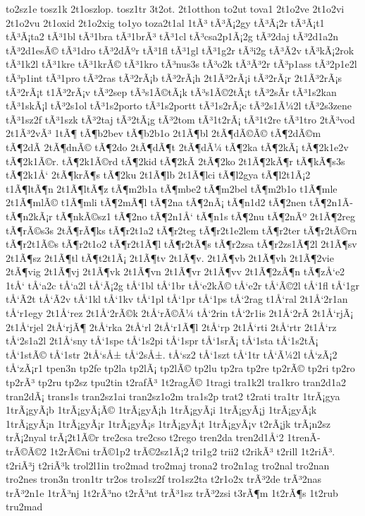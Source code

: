 {to2sz1e
tosz1k
2t1oszlop.
tosz1tr
3t2ot.
2t1otthon
to2ut
tova1
2t1o2ve
2t1o2vi
2t1o2vu
2t1oxid
2t1o2xig
to1yo
toza2t1al
1tÃ³
tÃ³Ã¡2gy
tÃ³Ã¡2r
tÃ³Ã¡t1
tÃ³Ã¡ta2
tÃ³1bl
tÃ³1bra
tÃ³1brÃ³
tÃ³1cl
tÃ³csa2p1Ã¡2g
tÃ³2daj
tÃ³2d1a2n
tÃ³2d1esÃ©
tÃ³1dro
tÃ³2dÃºr
tÃ³1fl
tÃ³1gl
tÃ³1g2r
tÃ³i2g
tÃ³Ã­2v
tÃ³kÃ¡2rok
tÃ³1k2l
tÃ³1kre
tÃ³1krÃ©
tÃ³1kro
tÃ³nus3s
tÃ³o2k
tÃ³Ã³2r
tÃ³p1ass
tÃ³2p1e2l
tÃ³p1int
tÃ³1pro
tÃ³2ras
tÃ³2rÃ¡b
tÃ³2rÃ¡h
2t1Ã³2rÃ¡i
tÃ³2rÃ¡r
2t1Ã³2rÃ¡s
tÃ³2rÃ¡t
t1Ã³2rÃ¡v
tÃ³2sep
tÃ³s1Ã©tÃ¡k
tÃ³s1Ã©2tÃ¡t
tÃ³2sÃ­r
tÃ³1s2kan
tÃ³1skÃ¡l
tÃ³2s1ol
tÃ³1s2porto
tÃ³1s2portt
tÃ³1s2rÃ¡c
tÃ³2s1Ã¼2l
tÃ³2s3zene
tÃ³1sz2f
tÃ³1szk
tÃ³2taj
tÃ³2tÃ¡g
tÃ³2tom
tÃ³1t2rÃ¡
tÃ³1t2re
tÃ³1tro
2tÃ³vod
2t1Ã³2vÃ³
1tÃ¶
tÃ¶b2bev
tÃ¶b2b1o
2t1Ã¶bl
2tÃ¶dÃ©Ã©
tÃ¶2dÃ©m
tÃ¶2dÃ­
2tÃ¶dnÃ©
tÃ¶2do
2tÃ¶dÃ¶t
2tÃ¶dÃ¼
tÃ¶2ka
tÃ¶2kÃ¡
tÃ¶2k1e2v
tÃ¶2k1Ã©r.
tÃ¶2k1Ã©rd
tÃ¶2kid
tÃ¶2kÃ­
2tÃ¶2ko
2t1Ã¶2kÃ¶r
tÃ¶kÃ¶s3s
tÃ¶2k1Å‘
2tÃ¶krÃ¶s
tÃ¶2ku
2t1Ã¶lb
2t1Ã¶lci
tÃ¶l2gya
tÃ¶l2t1Ã¡2
t1Ã¶ltÃ¶n
2t1Ã¶ltÃ¶z
tÃ¶m2b1a
tÃ¶mbe2
tÃ¶m2bel
tÃ¶m2b1o
t1Ã¶mle
2t1Ã¶mlÃ©
t1Ã¶mli
tÃ¶2mÃ¶l
tÃ¶2na
tÃ¶2nÃ¡
tÃ¶n1d2
tÃ¶2nen
tÃ¶2n1Ã­
tÃ¶n2kÃ¡r
tÃ¶nkÃ©sz1
tÃ¶2no
tÃ¶2n1Å‘
tÃ¶n1s
tÃ¶2nu
tÃ¶2nÃº
2t1Ã¶2reg
tÃ¶rÃ©s3s
2tÃ¶rÃ¶ks
tÃ¶r2t1a2
tÃ¶r2teg
tÃ¶r2t1e2lem
tÃ¶r2ter
tÃ¶r2tÃ©rn
tÃ¶r2t1Ã©s
tÃ¶r2t1o2
tÃ¶r2t1Ã¶l
tÃ¶r2tÃ¶s
tÃ¶r2zsa
tÃ¶r2zs1Ã¶2l
2t1Ã¶sv
2t1Ã¶sz
2t1Ã¶tl
tÃ¶t2t1Ã¡
2t1Ã¶tv
2t1Ã¶v.
2t1Ã¶vb
2t1Ã¶vh
2t1Ã¶2vie
2tÃ¶vig
2t1Ã¶vj
2t1Ã¶vk
2t1Ã¶vn
2t1Ã¶vr
2t1Ã¶vv
2t1Ã¶2zÃ¶n
tÃ¶zÅ‘e2
1tÅ‘
tÅ‘a2c
tÅ‘a2l
tÅ‘Ã¡2g
tÅ‘1bl
tÅ‘1br
tÅ‘e2kÃ©
tÅ‘e2r
tÅ‘Ã©2l
tÅ‘1fl
tÅ‘1gr
tÅ‘Ã­2t
tÅ‘Ã­2v
tÅ‘1kl
tÅ‘1kv
tÅ‘1pl
tÅ‘1pr
tÅ‘1ps
tÅ‘2rag
t1Å‘ral
2t1Å‘2r1an
tÅ‘r1egy
2t1Å‘rez
2t1Å‘2rÃ©k
2tÅ‘rÃ©Ã¼
tÅ‘2rin
tÅ‘2r1is
2t1Å‘2rÃ­
2t1Å‘rjÃ¡
2t1Å‘rjel
2tÅ‘rjÃ¶
2tÅ‘rka
2tÅ‘rl
2tÅ‘r1Ã¶l
2tÅ‘rp
2t1Å‘rti
2tÅ‘rtr
2t1Å‘rz
tÅ‘2s1a2l
2t1Å‘sny
tÅ‘1spe
tÅ‘1s2pi
tÅ‘1spr
tÅ‘1srÃ¡
tÅ‘1sta
tÅ‘1s2tÃ¡
tÅ‘1stÃ©
tÅ‘1str
2tÅ‘sÅ±
tÅ‘2sÅ±.
tÅ‘sz2
tÅ‘1szt
tÅ‘1tr
tÅ‘Ã¼2l
tÅ‘zÃ¡2
tÅ‘zÃ¡r1
tpen3n
tp2fe
tp2la
tp2lÃ¡
tp2lÃ©
tp2lu
tp2ra
tp2re
tp2rÃ©
tp2ri
tp2ro
tp2rÃ³
tp2ru
tp2sz
tpu2tin
t2rafÃ³
1t2ragÃ©
1tragi
tra1k2l
tra1kro
tran2d1a2
tran2dÃ¡
trans1s
tran2sz1ai
tran2sz1o2m
tra1s2p
trat2
t2rati
tra1tr
1trÃ¡gya
1trÃ¡gyÃ¡b
1trÃ¡gyÃ¡Ã©
1trÃ¡gyÃ¡h
1trÃ¡gyÃ¡i
1trÃ¡gyÃ¡j
1trÃ¡gyÃ¡k
1trÃ¡gyÃ¡n
1trÃ¡gyÃ¡r
1trÃ¡gyÃ¡s
1trÃ¡gyÃ¡t
1trÃ¡gyÃ¡v
t2rÃ¡jk
trÃ¡n2sz
trÃ¡2nyal
trÃ¡2t1Ã©r
tre2csa
tre2cso
t2rego
tren2da
tren2d1Å‘2
1trenÃ­
trÃ©Ã©2
1t2rÃ©ni
trÃ©1p2
trÃ©2sz1Ã¡2
tri1g2
trii2
t2rikÃ³
t2rill
1t2riÃ³.
t2riÃ³j
t2riÃ³k
trol2l1in
tro2mad
tro2maj
trona2
tro2n1ag
tro2nal
tro2nan
tro2nes
tron3n
tron1tr
tr2os
tro1sz2f
tro1sz2ta
t2r1o2x
trÃ³2de
trÃ³2nas
trÃ³2n1e
1trÃ³nj
1t2rÃ³no
t2rÃ³nt
trÃ³1sz
trÃ³2zsi
t3rÃ¶m
1t2rÃ¶s
1t2rub
tru2mad
}
